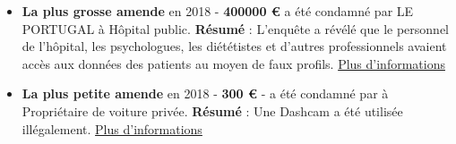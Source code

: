 \documentclass[french]{article}
\begin{document}
\newpage
\justify
	\begin{multicols}{2}
		\begin{itemize}
			\item \textbf{La plus grosse amende} en 2018 - \textbf{400000 €} a été condamné par LE PORTUGAL à Hôpital public.
			\newline
			\textbf{Résumé} : L’enquête a révélé que le personnel de l’hôpital, les psychologues, les diététistes et d’autres professionnels avaient accès aux données des patients au moyen de faux profils.
			\newline
			\href{https://www.cnpd.pt/bin/decisoes/Delib/20_984_2018.pdf}{Plus d'informations}
			\vspace{1cm}
		
			\item \textbf{La plus petite amende} en 2018 - \textbf{300 €} -  a été condamné par  à Propriétaire de voiture privée.
			\newline
			\textbf{Résumé} : Une Dashcam a été utilisée illégalement.
			\newline
			\href{https://www.ris.bka.gv.at/Dokumente/Dsk/DSBT_20180927_DSB_D550_084_0002_DSB_2018_00/DSBT_20180927_DSB_D550_084_0002_DSB_2018_00.pdf}{Plus d'informations}
		\end{itemize}
	\end{multicols}


\newpage
\end{document}
